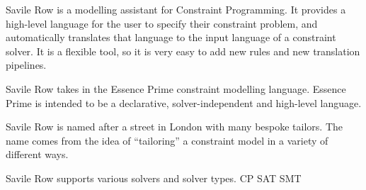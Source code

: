 Savile Row is a modelling assistant for Constraint Programming. It provides a
high-level language for the user to specify their constraint problem, and
automatically translates that language to the input language of a constraint
solver. It is a flexible tool, so it is very easy to add new rules and new
translation pipelines.

Savile Row takes in the Essence Prime constraint modelling language. Essence
Prime is intended to be a declarative, solver-independent and high-level language. 

Savile Row is named after a street in London with many bespoke tailors. The
name comes from the idea of ``tailoring'' a constraint model in a variety of
different ways.


Savile Row supports various solvers and solver types.
CP
SAT
SMT

